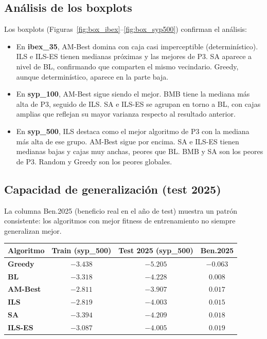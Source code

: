 \documentclass[12pt,a4paper]{article}
\begin{document}
\subsection{Análisis de los boxplots}

Los boxplots (Figuras~\ref{fig:box_ibex}--\ref{fig:box_syp500}) confirman el análisis:

\begin{itemize}
  \item En \textbf{ibex\_35}, AM-Best domina con caja casi imperceptible (determinístico).
  ILS e ILS-ES tienen medianas próximas y las mejores de P3. SA aparece a nivel de BL,
  confirmando que comparten el mismo vecindario. Greedy, aunque determinístico, aparece
  en la parte baja.

  \item En \textbf{syp\_100}, AM-Best sigue siendo el mejor. BMB tiene la mediana más
  alta de P3, seguido de ILS. SA e ILS-ES se agrupan en torno a BL, con cajas amplias
  que reflejan su mayor varianza respecto al resultado anterior.

  \item En \textbf{syp\_500}, ILS destaca como el mejor algoritmo de P3 con la mediana
  más alta de ese grupo. AM-Best sigue por encima. SA e ILS-ES tienen medianas bajas
  y cajas muy anchas, peores que BL. BMB y SA son los peores de P3. Random y Greedy
  son los peores globales.
\end{itemize}

\subsection{Capacidad de generalización (test 2025)}

La columna Ben.2025 (beneficio real en el año de test) muestra un patrón consistente:
los algoritmos con mejor fitness de entrenamiento no siempre generalizan mejor.

\begin{center}
\begin{tabular}{lcc|c}
\toprule
\textbf{Algoritmo} & \textbf{Train (syp\_500)} & \textbf{Test 2025 (syp\_500)} & \textbf{Ben.2025} \\
\midrule
\textbf{Greedy}  & $-3.438$ & $-5.205$ & $-0.063$ \\
\textbf{BL}      & $-3.318$ & $-4.228$ & $0.008$ \\
\textbf{AM-Best} & $-2.811$ & $-3.907$ & $0.017$ \\
\textbf{ILS}     & $-2.819$ & $-4.003$ & $0.015$ \\
\textbf{SA}      & $-3.394$ & $-4.209$ & $0.018$ \\
\textbf{ILS-ES}  & $-3.087$ & $-4.005$ & $\mathbf{0.019}$ \\
\bottomrule
\end{tabular}
\end{center}
\end{document}
